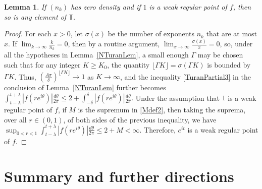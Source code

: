 \documentclass[11pt,a4paper]{article}
\newcommand{\T}{\mathbb{T}}
\def\into{\longrightarrow}
\def\klim{{\displaystyle\lim_{k\rightarrow\infty}}}
\newtheorem{lemma}[theorem]{Lemma}
\begin{document}
\begin{lemma}\label{zdLem} If $(n_k)$ has zero density and if $1$ is a weak regular point of $f$, then so is any element of $\T$.
\end{lemma}
\begin{proof} For each $x>0$, let $\sigma(x)$ be the number of exponents $n_k$ that are at most $x$.
If $\klim\frac{k}{n_k}=0$, then by a routine argument, ${\displaystyle\lim_{x\rightarrow\infty}}\frac{\sigma(x)}{x}=0$, so, under all the hypotheses in Lemma~\ref{NTuranLem}, a small enough $\Gamma$ may be chosen such that for any integer $K\geq K_0$, the quantity $\lfloor\Gamma K\rfloor=\sigma(\Gamma K)$ is bounded by $\Gamma K$. Thus, $\left(\frac{A\pi}{\delta}\right)^{\lfloor\Gamma K\rfloor}\into 1$ as $K\into\infty$, and the inequality \eqref{TuranPartial3} in the conclusion of Lemma~\ref{NTuranLem} further becomes
$
    \int_{t-\lambda}^{t+\lambda}\left|f(re^{i\theta})\right|\frac{d\theta}{2\pi} \leq 2+\int_{-\delta}^{\delta} \left|f(re^{i\theta})\right| \frac{d\theta}{2\pi}.
$
Under the assumption that $1$ is a weak regular point of $f$, if $M$ is the supremum in \eqref{Mdef2}, then taking the suprema, over all $r\in(0,1)$, of both sides of the previous inequality, we have $\sup_{0<r<1}\int_{t-\lambda}^{t+\lambda}\left|f(re^{i\theta})\right|\frac{d\theta}{2\pi}\leq 2+M<\infty$. Therefore, $e^{it}$ is a weak regular point of $f$.
\end{proof}

\section{Summary and further directions}\label{ThmSec}
\end{document}
